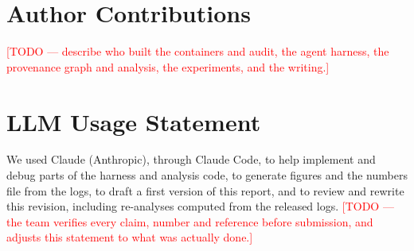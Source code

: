 \documentclass[11pt, a4paper]{article}
\newcommand{\todo}[1]{\textcolor{red}{[TODO --- #1]}}
\theoremstyle{definition}
\begin{document}
\section*{Author Contributions}
\todo{describe who built the containers and audit, the agent harness, the provenance graph and analysis, the experiments, and the writing.}

\section*{LLM Usage Statement}
We used Claude (Anthropic), through Claude Code, to help implement and debug parts of the harness and analysis code, to generate figures and the numbers file from the logs, to draft a first version of this report, and to review and rewrite this revision, including re-analyses computed from the released logs. \todo{the team verifies every claim, number and reference before submission, and adjusts this statement to what was actually done.}
\end{document}
